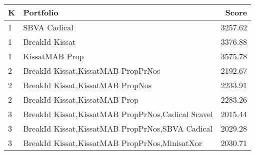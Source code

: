 \begin{tabular}{l|p{.9\linewidth}|r}
\toprule
K & Portfolio & Score \\
\midrule
1 & SBVA Cadical & 3257.62 \\
1 & BreakId Kissat & 3376.88 \\
1 & KissatMAB Prop & 3575.78 \\
2 & BreakId Kissat,KissatMAB PropPrNos & 2192.67 \\
2 & BreakId Kissat,KissatMAB PropNos & 2233.91 \\
2 & BreakId Kissat,KissatMAB Prop & 2283.26 \\
3 & BreakId Kissat,KissatMAB PropPrNos,Cadical Scavel & 2015.44 \\
3 & BreakId Kissat,KissatMAB PropPrNos,SBVA Cadical & 2029.28 \\
3 & BreakId Kissat,KissatMAB PropPrNos,MinisatXor & 2030.71 \\
\bottomrule
\end{tabular}
